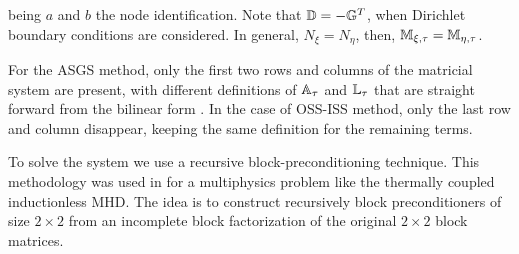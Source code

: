 being $a$ and $b$ the node identification. Note that $\mathbb{D}=-\mathbb{G}^T$, when Dirichlet boundary conditions are considered. In general, $N_\xi=N_\eta$, then, $\mathbb{M}_{\xi,\tau}=\mathbb{M}_{\eta,\tau}$.

For the ASGS method, only the first two rows and columns of the matricial system  are present, with different definitions of $\mathbb{A}_{\tau}$ and $\mathbb{L}_{\tau}$ that are straight forward from the bilinear form . In the case of OSS-ISS method, only the last row and column disappear, keeping the same definition for the remaining terms.

To solve the system  we use a recursive block-preconditioning technique. This methodology was used in \cite{badia_block_2014} for a multiphysics problem like the thermally coupled inductionless MHD. The idea is to construct recursively block preconditioners of size $2\times2$ from an incomplete block factorization of the original $2\times2$ block matrices.

